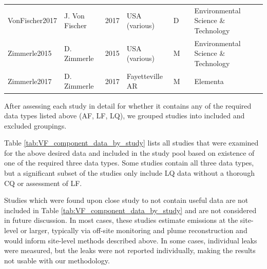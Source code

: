 \documentclass[11pt]{report}
\begin{document}
{{{{\begin{landscape}
\begin{table}[]
\begin{scriptsize}
\begin{tabular*}{1\columnwidth}{lllllll}
VonFischer2017    	& J. Von Fischer         	& 2017 	& USA (various)  	& D     	& \cite{VonFischer2017}       & Environmental Science \& Technology   \\
Zimmerle2015      	& D. Zimmerle  	& 2015 	& USA (various)  	& M     	& \cite{Zimmerle2015}   & Environmental Science \& Technology   \\
Zimmerle2017      	& D. Zimmerle  	& 2017 	& Fayetteville AR	& M     	& \cite{Zimmerle2017}    & Elementa      \\   
\bottomrule
\end{tabular*}
\end{scriptsize}
\end{table}
\end{landscape}


After assessing each study in detail for whether it contains any of the required data types listed above (AF, LF, LQ), we grouped studies into included and excluded groupings.  

Table \ref{tab:VF_component_data_by_study} lists all studies that were examined for the above desired data and included in the study pool based on existence of one of the required three data types. Some studies contain all three data types, but a significant subset of the studies only include LQ data without a thorough CQ or assessment of LF.

Studies which were found upon close study to not contain useful data are not included in Table \ref{tab:VF_component_data_by_study} and are not considered in future discussion. In most cases, these studies estimate emissions at the site-level or larger, typically via off-site monitoring and plume reconstruction and would inform site-level methods described above. In some cases, individual leaks were measured, but the leaks were not reported individually, making the results not usable with our methodology.


}}}}
\end{document}
